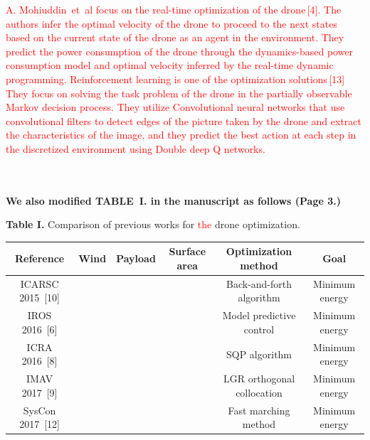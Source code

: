\documentclass[onecolumn]{IEEEconf}
\newcommand{\cmark}{\ding{51}}%
\newcommand{\xmark}{\ding{55}}%
\begin{document}
\begin{description}
\begin{mdframed}[ linewidth=.75pt, userdefinedwidth=0.9\textwidth]
    \textcolor{red}{A. Mohiuddin~et~al focus on the real-time optimization of the drone\,[4]. 
    The authors infer the optimal velocity of the drone to proceed to the next states based on the current state of the drone as an agent in the environment.
    They predict the power consumption of the drone through the dynamics-based power consumption model and optimal velocity inferred by the real-time dynamic programming.
    Reinforcement learning is one of the optimization solutions\,[13]
    They focus on solving the task problem of the drone in the partially observable Markov decision process. 
    They utilize Convolutional neural networks that use convolutional filters to detect edges of the picture taken by the drone and extract the characteristics of the image, and they predict the best action at each step in the discretized environment using Double deep Q networks.}
    \end{mdframed}
    ~\\
	~\\
    \textbf{We also modified TABLE~I. in the manuscript as follows (Page 3.)}
    \begin{mdframed}
    \textbf{Table I.} Comparison of previous works for \textcolor{red}{the} drone optimization.
    \centering
    \label{Table: survay_result}
    \begin{tabular}{|c|c|c|c|c|c|}
    \hline
    \small Reference & \small Wind & \small Payload & \small Surface area & \small Optimization method & \small Goal \\ \hline
    \small ICARSC 2015~[10] & %
    & %
    & %
    & \small Back-and-forth algorithm & \small Minimum energy \\ \hline
    \small IROS 2016~[6] & \cmark & %
    & %
    & \small Model predictive control & \small Minimum energy \\ \hline
    \small ICRA 2016~[8]  & %
    & \cmark & %
    & \small SQP algorithm & \small Minimum energy \\ \hline
    \small IMAV 2017~[9] & %
    & \cmark & \cmark & \small LGR orthogonal collocation & \small Minimum energy \\ \hline
    SysCon 2017~[12] & \cmark & %
    & %
    & \small Fast marching method & \small Minimum energy \\ \hline

\end{tabular}
\end{mdframed}
\end{description}
\end{document}
